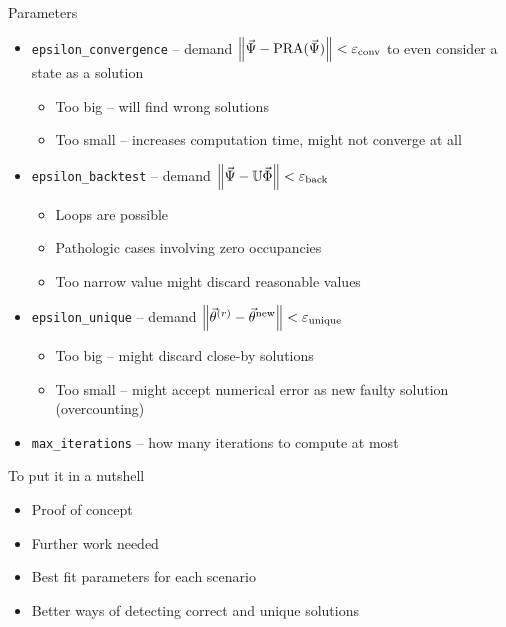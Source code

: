 
\begin{frame}{Parameters}
%
\begin{itemize}
\item \texttt{epsilon\_convergence} -- demand $\norm{\vec{\Psi} - \text{PRA}(\vec{\Psi})} < \varepsilon_{\text{conv}}$ to even consider a state as a solution
	\begin{itemize}
	\item Too big -- will find wrong solutions
	\item Too small -- increases computation time, might not converge at all
	\end{itemize}
\item \texttt{epsilon\_backtest} -- demand $\norm{\vec{\Psi} - \mathbb{U} \vec{\Phi}} < \varepsilon_{\text{back}}$
	\begin{itemize}
	\item Loops are possible
	\item Pathologic cases involving zero occupancies
	\item Too narrow value might discard reasonable values
	\end{itemize}
\item \texttt{epsilon\_unique} -- demand $\norm{\vec{\theta}^{(r)} - \vec{\theta}^{\text{new}}} < \varepsilon_{\text{unique}}$
	\begin{itemize}
	\item Too big -- might discard close-by solutions
	\item Too small -- might accept numerical error as new faulty solution (overcounting)
	\end{itemize}
\item \texttt{max\_iterations} -- how many iterations to compute at most
\end{itemize}
%
\end{frame}


\begin{frame}{To put it in a nutshell}
%
\begin{itemize}
\item Proof of concept
\item Further work needed
\item Best fit parameters for each scenario
\item Better ways of detecting correct and unique solutions
\end{itemize}
%
\end{frame}